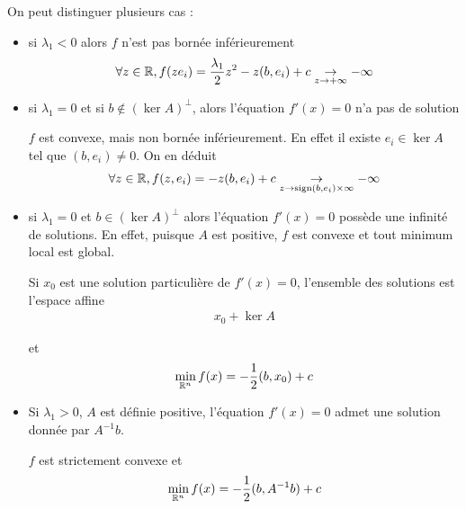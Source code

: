 \documentclass[french,a4paper,10pt]{article}
\begin{document}
	\begin{oc-remark}
		On peut distinguer plusieurs cas :
		\begin{itemize}
			\item si $\lambda_1<0$ alors $f$ n'est pas bornée inférieurement
				\[\begin{aligned}
					\forall z\in\mathbb{R},f(ze_i)=\frac{\lambda_1}2z^2-z(b,e_i)+c\underset{z\to+\infty}\to-\infty
				\end{aligned}\]
				
			\item si $\lambda_1=0$ et si $b\notin (\ker A)^\perp$, alors l'équation $f'(x)=0$ n'a pas de solution
			
			$f$ est convexe, mais non bornée inférieurement. En effet il existe $e_i\in\ker A$ tel que $(b,e_i)\ne 0$. On en déduit
				\[\begin{aligned}
					\forall z\in\mathbb{R},f(z,e_i)=-z(b,e_i)+c\underset{z\to\text{sign}(b,e_i)\times\infty}\to-\infty
				\end{aligned}\]
				
			\item si $\lambda_1=0$ et $b\in(\ker A)^\perp$ alors l'équation $f'(x)=0$ possède une infinité de solutions. En effet, puisque $A$ est positive, $f$ est convexe et tout minimum local est global.
			
			Si $x_0$ est une solution particulière de $f'(x)=0$, l'ensemble des solutions est l'espace affine
				\[\begin{aligned}
					x_0+\ker A
				\end{aligned}\]
				
			et 
				\[\begin{aligned}
					\min_{\mathbb{R}^n}f(x)=-\frac12(b,x_0)+c
				\end{aligned}\]
			\item Si $\lambda_1>0$, $A$ est définie positive, l'équation $f'(x)=0$ admet une solution donnée par $A^{-1}b$.
			
			$f$ est strictement convexe et
				\[\begin{aligned}
					\min_{\mathbb{R}^n}f(x)=-\frac12(b,A^{-1}b)+c
				\end{aligned}\]
		\end{itemize}
	\end{oc-remark}
		
\end{document}
